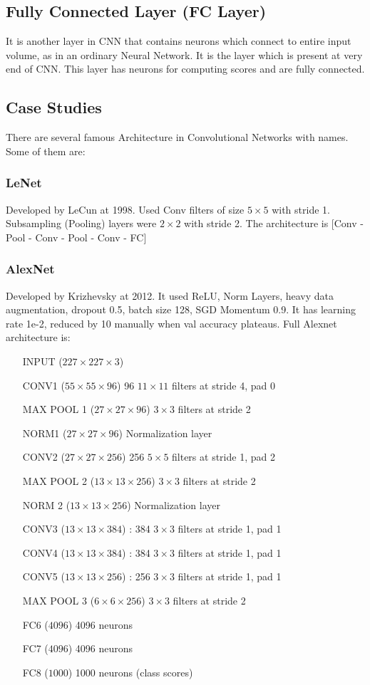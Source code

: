\documentclass[12pt,a4paper]{article}
\begin{document}
\subsection{Fully Connected Layer (FC Layer)}
It is another layer in CNN that contains neurons which connect to entire input volume, as in an ordinary Neural Network. It is the layer which is present at very end of CNN. This layer has neurons for computing scores and are fully connected.

\subsection{Case Studies}
There are several famous Architecture in Convolutional Networks with names. Some of them are:
\subsubsection{LeNet}
Developed by LeCun at 1998. Used Conv filters of size $5 \times 5$ with stride 1. Subsampling (Pooling) layers were $2 \times 2$ with stride 2. The architecture is [Conv - Pool - Conv - Pool - Conv - FC]
\subsubsection{AlexNet}
Developed by Krizhevsky at 2012. It used ReLU, Norm Layers, heavy data augmentation, dropout 0.5, batch size 128, SGD Momentum 0.9. It has learning rate 1e-2, reduced by 10 manually when val accuracy plateaus. Full Alexnet architecture is:
\begin{itemize}
    \item[INPUT] ($227 \times 227 \times 3$)
    \item[CONV1]  ($55 \times 55 \times 96$) 96 $11 \times 11$ filters at stride 4, pad 0
    \item[MAX POOL 1]  ($27 \times 27 \times 96$)  $3 \times 3$ filters at stride 2
    \item[NORM1]  ($27 \times 27 \times 96$) Normalization layer
    \item[CONV2]  ($27 \times 27 \times 256$) 256 $5 \times 5$ filters at stride 1, pad 2
    \item[MAX POOL 2]  ($13 \times 13 \times 256$) $3 \times 3$ filters at stride 2
    \item[NORM 2]  ($13 \times 13 \times 256$) Normalization layer
    \item[CONV3]  ($13 \times 13 \times 384$) : 384 $3 \times 3$ filters at stride 1, pad 1
    \item[CONV4]  ($13 \times 13 \times 384$) : 384 $3 \times 3$ filters at stride 1, pad 1
    \item[CONV5]  ($13 \times 13 \times 256$) : 256 $3 \times 3$ filters at stride 1, pad 1
    \item[MAX POOL 3]  ($6 \times 6 \times 256$) $3 \times 3$ filters at stride 2
    \item[FC6]  ($4096$) 4096 neurons
    \item[FC7]  ($4096$) 4096 neurons
    \item[FC8]  ($1000$) 1000 neurons (class scores)
\end{itemize}
\end{document}

